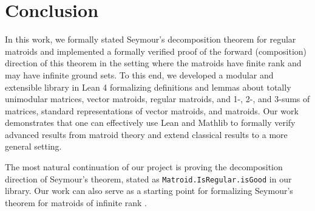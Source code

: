 \section{Conclusion}

In this work, we formally stated Seymour's decomposition theorem for regular matroids and implemented a formally verified proof of the forward (composition) direction of this theorem in the setting where the matroids have finite rank and may have infinite ground sets. To this end, we developed a modular and extensible library in Lean 4 formalizing definitions and lemmas about totally unimodular matrices, vector matroids, regular matroids, and 1-, 2-, and 3-sums of matrices, standard representations of vector matroids, and matroids.
Our work demonstrates that one can effectively use Lean and Mathlib to formally verify advanced results from matroid theory and extend classical results to a more general setting.

The most natural continuation of our project is proving the decomposition direction of Seymour's theorem, stated as \texttt{Matroid.IsRegular.isGood} in our library. Our work can also serve as a starting point for formalizing Seymour's theorem for matroids of infinite rank \cite{Bowler2013}.

